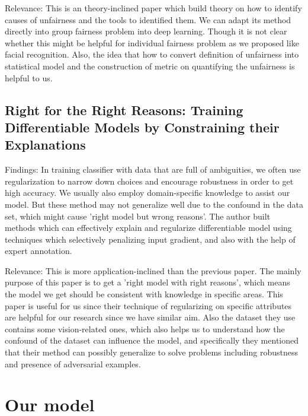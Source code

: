 \documentclass{article}
\begin{document}
\noindent Relevance: This is an theory-inclined paper which build theory on how to identify causes of unfairness and the tools to identified them. We can adapt its method directly into group fairness problem into deep learning. Though it is not clear whether this might be helpful for individual fairness problem as we proposed like facial recognition. Also, the idea that how to convert definition of unfairness into statistical model and the construction of metric on quantifying the unfairness is helpful to us.

\subsection{Right for the Right Reasons: Training Differentiable Models by Constraining their Explanations\cite{ijcai2017-371}} 
Findings: In training classifier with data that are full of ambiguities, we often use regularization to narrow down choices and encourage robustness in order to get high accuracy. We usually also employ domain-specific knowledge to assist our model. But these method may not generalize well due to the confound in the data set, which might cause 'right model but wrong reasons'. The author built methods which can effectively explain and regularize differentiable model using techniques which selectively penalizing input gradient, and also with the help of expert annotation.

\noindent Relevance: This is more application-inclined than the previous paper. The mainly purpose of this paper is to get a 'right model with right reasons', which means the model we get should be consistent with knowledge in specific areas. This paper is useful for us since their technique of regularizing on specific  attributes are helpful for our research since we have similar aim. Also the dataset they use contains some vision-related ones, which also helps us to understand how the confound of the dataset can influence the model, and specifically they mentioned that their method can possibly generalize to solve problems including robustness and presence of adversarial examples.
\section{Our model}


\end{document}
